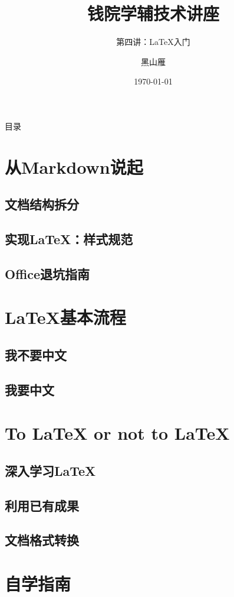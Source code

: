 \documentclass{beamer}
\title[Tech Lec]{钱院学辅技术讲座}
\subtitle{第四讲：\LaTeX 入门}
\author[xjtu-blacksmith]{黑山雁}
\institute[Xi'an Jiaotong University]
{
  西安交通大学
}
\date{\today}
\begin{document}
\begin{frame}
\maketitle
\end{frame}

\begin{frame}{目录}
    \tableofcontents
\end{frame}

\section{从Markdown说起}
\subsection{文档结构拆分}
\subsection{实现\LaTeX ：样式规范}
\subsection{Office退坑指南}

\section{\LaTeX 基本流程}
\subsection{我不要中文}
\subsection{我要中文}

\section{To \LaTeX{}  or not to \LaTeX}
\subsection{深入学习\LaTeX}
\subsection{利用已有成果}
\subsection{文档格式转换}

\section{自学指南}
\end{document}
